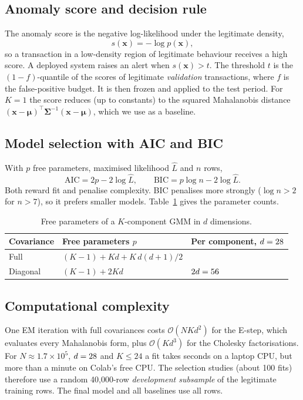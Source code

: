\documentclass[12pt]{article}
\begin{document}
\subsection{Anomaly score and decision rule}
The anomaly score is the negative log-likelihood under the legitimate density,
\begin{equation}
s(\mathbf{x})=-\log p(\mathbf{x}),
\end{equation}
so a transaction in a low-density region of legitimate behaviour receives a high score. A deployed system raises an
alert when $s(\mathbf{x})>t$. The threshold $t$ is the $(1-f)$-quantile of the scores of legitimate \emph{validation}
transactions, where $f$ is the false-positive budget. It is then frozen and applied to the test period. For $K=1$ the
score reduces (up to constants) to the squared Mahalanobis distance
$(\mathbf{x}-\bm\mu)^{\top}\bm\Sigma^{-1}(\mathbf{x}-\bm\mu)$, which we use as a baseline.

\subsection{Model selection with AIC and BIC}
With $p$ free parameters, maximised likelihood $\hat L$ and $n$ rows,
\begin{equation}
\mathrm{AIC}=2p-2\log\hat L,\qquad \mathrm{BIC}=p\log n-2\log\hat L .
\end{equation}
Both reward fit and penalise complexity. BIC penalises more strongly ($\log n>2$ for $n>7$), so it prefers smaller
models. Table~\ref{tab:params} gives the parameter counts.

\begin{table}[H]
\centering\small
\caption{Free parameters of a $K$-component GMM in $d$ dimensions.}
\label{tab:params}
\begin{tabular}{@{}l l l@{}}
\toprule
\textbf{Covariance} & \textbf{Free parameters $p$} & \textbf{Per component, $d=28$}\\
\midrule
Full & $(K-1)+Kd+K\,d(d+1)/2$ & \perComp{}\\
Diagonal & $(K-1)+2Kd$ & $2d=\the\numexpr 2*\selD\relax$\\
\bottomrule
\end{tabular}
\end{table}

\subsection{Computational complexity}
One EM iteration with full covariances costs $\mathcal{O}(N K d^2)$ for the E-step, which evaluates every Mahalanobis
form, plus $\mathcal{O}(K d^3)$ for the Cholesky factorisations. For $N\approx1.7\times10^{5}$, $d=28$ and $K\le24$
a fit takes seconds on a laptop CPU, but more than a minute on Colab's free CPU. The selection studies (about 100
fits) therefore use a random 40{,}000-row \emph{development subsample} of the legitimate training rows. The final model
and all baselines use all rows.
\end{document}
